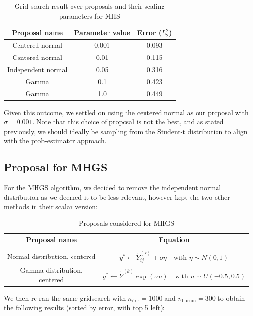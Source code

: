 \documentclass[12pt]{memoir}
\newcommand{\nitern}[1]{$n_{\text{iter}}=#1$}
\newcommand{\nburninn}[1]{$n_{\text{burnin}}=#1$}
\begin{document}
\begin{table}[H]

    \begin{center}
        \begin{tabular}{|c|c|c|}
            \hline
            Proposal name & Parameter value & Error ($L_2^2$)\\
            \hline\hline
            Centered normal& 0.001 & 0.093\\
            Centered normal&0.01  &0.115\\
            Independent normal& 0.05 &0.316\\
            Gamma&0.1  &0.423\\
            Gamma&1.0   &0.449\\\hline
        \end{tabular}
\end{center}
\caption{Grid search result over proposals and their scaling parameters for MHS}
\label{table:proposal-grid-search-mhs}
\end{table}
Given this outcome, we settled on using the centered normal as our proposal with $\sigma=0.001$. Note that this choice of proposal is not the best, and as stated previously, we should ideally be sampling from the Student-t distribution to align with the prob-estimator approach. 

\subsection*{Proposal for MHGS}
For the MHGS algorithm, we decided to remove the independent normal distribution as we deemed it to be less relevant, however kept the two other methods in their scalar version:

\begin{table}[H]

    \begin{center}
        \begin{tabular}{|c|c|}
            \hline
            Proposal name & Equation\\
            \hline\hline
             & \\[-10pt]
            Normal distribution, centered & $y^* \gets \tilde Y^{(k)}_{ij} + \sigma {\eta} \quad\text{with } \eta \sim N(0,1)$\\
            Gamma distribution, centered & $y^* \gets \tilde Y^{(k)} \exp (\sigma u)\quad \text{with } {u} \sim U(-0.5, 0.5)$\\\hline
        \end{tabular}
\end{center}
\caption{Proposals considered for MHGS}
\label{table:proposal-comp-mhgs}
\end{table}
We then re-ran the same gridsearch with \nitern{1000} and \nburninn{300} to obtain the following results (sorted by error, with top 5 left): 
\end{document}
